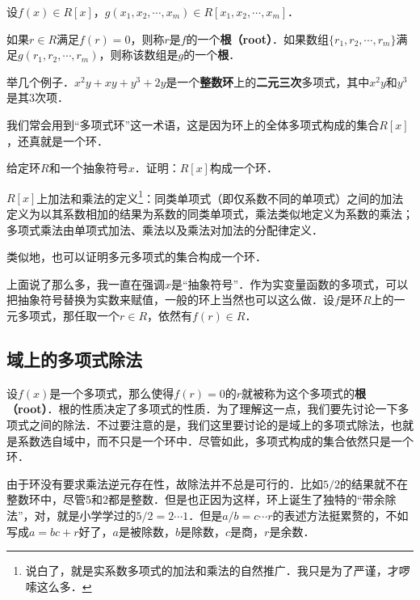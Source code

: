 \begin{definition}{}

设$f(x)\in R[x]$，$g(x_1, x_2, \cdots, x_m)\in R[x_1, x_2, \cdots, x_m]$．

如果$r\in R$满足$f(r)=0$，则称$r$是$f$的一个\textbf{根（root）}．如果数组$\{r_1, r_2, \cdots, r_m\}$满足$g(r_1, r_2, \cdots, r_m)$，则称该数组是$g$的一个\textbf{根}．

\end{definition}

举几个例子．$x^2y+xy+y^3+2y$是一个\textbf{整数环}上的\textbf{二元三次}多项式，其中$x^2y$和$y^3$是其$3$次项．

我们常会用到“多项式环”这一术语，这是因为环上的全体多项式构成的集合$R[x]$，还真就是一个环．

\begin{exercise}{}
给定环$R$和一个抽象符号$x$．证明：$R[x]$构成一个环．

$R[x]$上加法和乘法的定义\footnote{说白了，就是实系数多项式的加法和乘法的自然推广．我只是为了严谨，才啰嗦这么多．}：同类单项式（即仅系数不同的单项式）之间的加法定义为以其系数相加的结果为系数的同类单项式，乘法类似地定义为系数的乘法；多项式乘法由单项式加法、乘法以及乘法对加法的分配律定义．
\end{exercise}

类似地，也可以证明多元多项式的集合构成一个环．

上面说了那么多，我一直在强调$x$是“抽象符号”．作为实变量函数的多项式，可以把抽象符号替换为实数来赋值，一般的环上当然也可以这么做．设$f$是环$R$上的一元多项式，那任取一个$r\in R$，依然有$f(r)\in R$．




\subsection{域上的多项式除法}

设$f(x)$是一个多项式，那么使得$f(r)=0$的$r$就被称为这个多项式的\textbf{根（root）}．根的性质决定了多项式的性质．为了理解这一点，我们要先讨论一下多项式之间的除法．不过要注意的是，我们这里要讨论的是域上的多项式除法，也就是系数选自域中，而不只是一个环中．尽管如此，多项式构成的集合依然只是一个环．

由于环没有要求乘法逆元存在性，故除法并不总是可行的．比如$5/2$的结果就不在整数环中，尽管$5$和$2$都是整数．但是也正因为这样，环上诞生了独特的“带余除法”，对，就是小学学过的$5/2=2\cdots 1$．但是$a/b=c\cdots r$的表述方法挺累赘的，不如写成$a=bc+r$好了，$a$是被除数，$b$是除数，$c$是商，$r$是余数．

